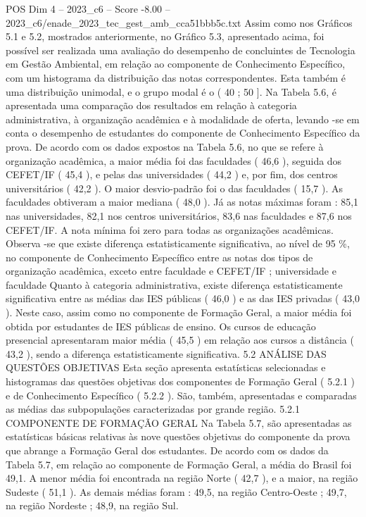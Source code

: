 \begin{textsample}{POS Dim 4 – 2023\_c6 – Score -8.00 – 2023\_c6/enade\_2023\_tec\_gest\_amb\_cca51bbb5c.txt}
Assim como nos Gráficos 5.1 e 5.2, mostrados anteriormente, no Gráfico 5.3, apresentado acima, foi possível ser realizada uma avaliação do desempenho de concluintes de Tecnologia em Gestão Ambiental, em relação ao componente de Conhecimento Específico, com um histograma da distribuição das notas correspondentes.
Esta também é uma distribuição unimodal, e o grupo modal é o ( 40 ; 50 ].
Na Tabela 5.6, é apresentada uma comparação dos resultados em relação à categoria administrativa, à organização acadêmica e à modalidade de oferta, levando -se em conta o desempenho de estudantes do componente de Conhecimento Específico da prova.
De acordo com os dados expostos na Tabela 5.6, no que se refere à organização acadêmica, a maior média foi das faculdades ( 46,6 ), seguida dos CEFET/IF ( 45,4 ), e pelas das universidades ( 44,2 ) e, por fim, dos centros universitários ( 42,2 ).
O maior desvio-padrão foi o das faculdades ( 15,7 ).
As faculdades obtiveram a maior mediana ( 48,0 ).
Já as notas máximas foram : 85,1 nas universidades, 82,1 nos centros universitários, 83,6 nas faculdades e 87,6 nos CEFET/IF.
A nota mínima foi zero para todas as organizações acadêmicas.
Observa -se que existe diferença estatisticamente significativa, ao nível de 95 \%, no componente de Conhecimento Específico entre as notas dos tipos de organização acadêmica, exceto entre faculdade e CEFET/IF ; universidade e faculdade Quanto à categoria administrativa, existe diferença estatisticamente significativa entre as médias das IES públicas ( 46,0 ) e as das IES privadas ( 43,0 ).
Neste caso, assim como no componente de Formação Geral, a maior média foi obtida por estudantes de IES públicas de ensino.
Os cursos de educação presencial apresentaram maior média ( 45,5 ) em relação aos cursos a distância ( 43,2 ), sendo a diferença estatisticamente significativa. 5.2 ANÁLISE DAS QUESTÕES OBJETIVAS Esta seção apresenta estatísticas selecionadas e histogramas das questões objetivas dos componentes de Formação Geral ( 5.2.1 ) e de Conhecimento Específico ( 5.2.2 ).
São, também, apresentadas e comparadas as médias das subpopulações caracterizadas por grande região. 5.2.1 COMPONENTE DE FORMAÇÃO GERAL Na Tabela 5.7, são apresentadas as estatísticas básicas relativas às nove questões objetivas do componente da prova que abrange a Formação Geral dos estudantes.
De acordo com os dados da Tabela 5.7, em relação ao componente de Formação Geral, a média do Brasil foi 49,1.
A menor média foi encontrada na região Norte ( 42,7 ), e a maior, na região Sudeste ( 51,1 ).
As demais médias foram : 49,5, na região Centro-Oeste ; 49,7, na região Nordeste ; 48,9, na região Sul.

\end{textsample}
